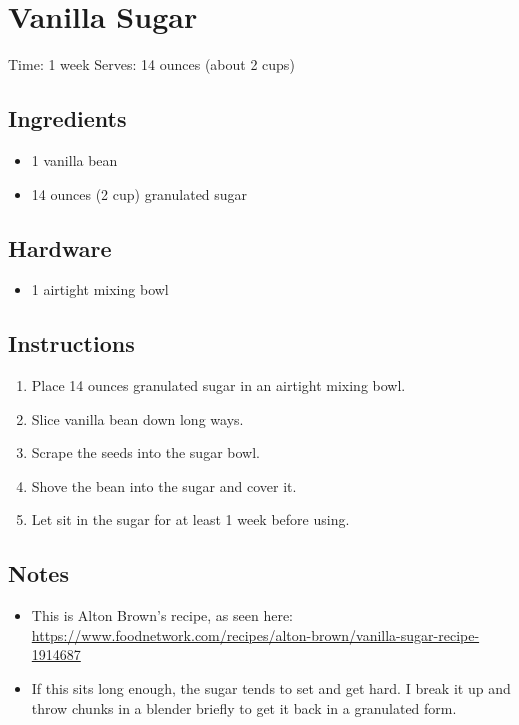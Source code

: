 \section{Vanilla Sugar}
\label{vanillaSugar}
\setcounter{secnumdepth}{0}
Time: 1 week
Serves: 14 ounces (about 2 cups)

\begin{multicols}{2}
\subsection*{Ingredients}
\begin{itemize}
    \item 1 vanilla bean
    \item 14 ounces (2 cup) granulated sugar
\end{itemize}

\subsection*{Hardware}
\begin{itemize}
    \item 1 airtight mixing bowl
\end{itemize}
\clearpage

\subsection*{Instructions}
\begin{enumerate}
    \item Place 14 ounces granulated sugar in an airtight mixing bowl.
    \item Slice vanilla bean down long ways.
    \item Scrape the seeds into the sugar bowl.
    \item Shove the bean into the sugar and cover it.
    \item Let sit in the sugar for at least 1 week before using.
\end{enumerate}

\subsection*{Notes}
\begin{itemize}
    \item This is Alton Brown's recipe, as seen here: \url{https://www.foodnetwork.com/recipes/alton-brown/vanilla-sugar-recipe-1914687}
    \item If this sits long enough, the sugar tends to set and get hard. I break it up and throw chunks in a blender briefly to get it back in a granulated form.
\end{itemize}
\end{multicols}
\clearpage